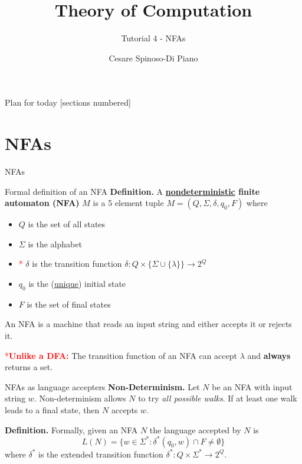 \documentclass[10pt]{beamer}
\title{Theory of Computation}
\subtitle{Tutorial 4 - NFAs}
\date{}
\author{Cesare Spinoso-Di Piano}
\begin{document}
\maketitle

\begin{frame}{Plan for today}
    [sections numbered]
    \tableofcontents[hideallsubsections]
\end{frame}


\section{NFAs}

\begin{frame}{NFAs}

\end{frame}

\begin{frame}[t]{Formal definition of an NFA}
    \textbf{Definition.} A \textbf{\underline{nondeterministic} finite automaton (NFA)} $M$ is a 5 element tuple $M = (Q, \Sigma, \delta, q_0, F)$ where
    \begin{itemize}
        \item $Q$ is the set of all states
        \item $\Sigma$ is the alphabet
        \item \textcolor{red}{*} $\delta$ is the transition function $\delta: Q \times \{\Sigma \cup \{\lambda\} \} \rightarrow 2^Q$
        \item $q_0$ is the (\underline{unique}) initial state
        \item $F$ is the set of final states
    \end{itemize}
    An NFA is a machine that reads an input string and either accepts it or rejects it.

    \textcolor{red}{*\textbf{Unlike a DFA: }}
    The transition function of an NFA can accept $\lambda$ and \textbf{always} returns a set.
\end{frame}


\begin{frame}{NFAs as language accepters}
    \textbf{Non-Determinism.} Let $N$ be an NFA with input string $w$. Non-determinism allows $N$ to try \textit{all possible walks}. If at least one walk leads to a final state, then $N$ accepts $w$.

    \textbf{Definition.} Formally, given an NFA $N$ the language accepted by $N$ is
    \[
        L(N) = \{w \in \Sigma ^*: \delta^*(q_0, w) \cap F \neq \emptyset\}
    \]
    where $\delta^*$ is the extended transition function $\delta^*: Q \times \Sigma^* \rightarrow 2^Q$.
\end{frame}
\end{document}
